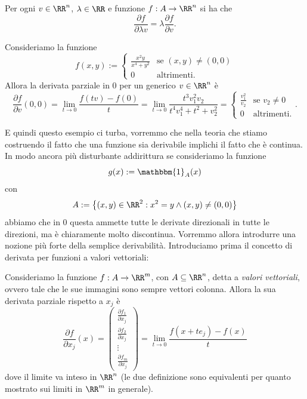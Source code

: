 \documentclass[11pt]{scrartcl}
\begin{document}
	\begin{proposition}
		Per ogni $v\in\RR^n$, $\lambda\in \RR$ e funzione $f:A\to\RR^n$ si ha che
		$$\frac{\partial f}{\partial \lambda v}=\lambda\frac{\partial f}{\partial v}.$$
	\end{proposition}
	\begin{example}
		Consideriamo la funzione
		$$f(x,y):=\begin{cases}
			\frac{x^2y}{x^4+y^2} & \text{se $(x,y)\ne (0,0)$} \\
			0 & \text{altrimenti.}
		\end{cases}$$
		Allora la derivata parziale in $0$ per un generico $v\in \RR^n$ è
		$$\frac{\partial f}{\partial v}(0,0)=\lim_{t\to 0}\frac{f(tv)-f(0)}{t}=\lim_{t\to 0}\frac{t^3v_1^2v_2}{t^4v_1^4+t^2+v_2^2}=\begin{cases}
			\frac{v_1^2}{v_2} & \text{se $v_2\ne 0$} \\
			0 & \text{altrimenti.}
		\end{cases}.$$
	\end{example}
	E quindi questo esempio ci turba, vorremmo che nella teoria che stiamo costruendo il fatto che una funzione sia derivabile implichi il fatto che è continua. In modo ancora più disturbante addirittura se consideriamo la funzione
	$$g(x):=\mathbbm{1}_{A}(x)$$
	con 
	$$A:=\left\{(x,y)\in\RR^2: x^2=y \land (x,y)\ne (0,0)\right\}$$
	abbiamo che in $0$ questa ammette tutte le derivate direzionali in tutte le direzioni, ma è chiaramente molto discontinua. Vorremmo allora introdurre una nozione più forte della semplice derivabilità. Introduciamo prima il concetto di derivata per funzioni a valori vettoriali:
	\begin{definition}
		Consideriamo la funzione $f:A\to\RR^m$, con $A\subseteq \RR^n$, detta a \textit{valori vettoriali}, ovvero tale che le sue immagini sono sempre vettori colonna. Allora la sua derivata parziale rispetto a $x_j$ è 
		$$\frac{\partial f}{\partial x_j}(x)=
		\begin{pmatrix}
			\frac{\partial f_1}{\partial x_j} \\
			\frac{\partial f_2 }{\partial x_j} \\
			\vdots \\
			\frac{\partial f_m}{\partial x_j}
		\end{pmatrix}
		=
		\lim_{t\to 0}\frac{f(x+te_j)-f(x)}{t}
		$$
		dove il limite va inteso in $\RR^n$ (le due definizione sono equivalenti per quanto mostrato sui limiti in $\RR^m$ in generale).
	\end{definition}
\end{document}
